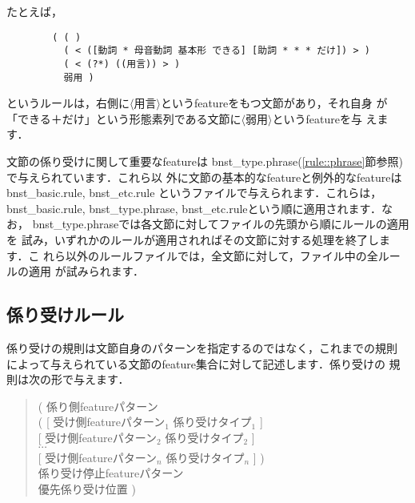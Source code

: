 \documentclass[a4j,11pt,titlepage]{jarticle}
\def\fl{$\langle$}
\def\fr{$\rangle$}
\begin{document}
たとえば，
\begin{verbatim}
        ( ( )
          ( < ([動詞 * 母音動詞 基本形 できる] [助詞 * * * だけ]) > )
          ( < (?*) ((用言)) > )
          弱用 )
\end{verbatim}
というルールは，右側に\fl 用言\fr というfeatureをもつ文節があり，それ自身
が「できる＋だけ」という形態素列である文節に\fl 弱用\fr というfeatureを与
えます．

文節の係り受けに関して重要なfeatureは
bnst\_type.phrase(\ref{rule::phrase}節参照)で与えられています．これら以
外に文節の基本的なfeatureと例外的なfeatureはbnst\_basic.rule,
bnst\_etc.rule というファイルで与えられます．これらは，bnst\_basic.rule,
bnst\_type.phrase, bnst\_etc.ruleという順に適用されます．なお，
bnst\_type.phraseでは各文節に対してファイルの先頭から順にルールの適用を
試み，いずれかのルールが適用されればその文節に対する処理を終了します．こ
れら以外のルールファイルでは，全文節に対して，ファイル中の全ルールの適用
が試みられます．


\subsection{係り受けルール}

係り受けの規則は文節自身のパターンを指定するのではなく，これまでの規則
によって与えられている文節のfeature集合に対して記述します．係り受けの
規則は次の形で与えます．
\begin{quote}
\hspace*{1cm} ( 係り側featureパターン \\
\hspace*{2cm}    ( [ 受け側featureパターン$_1$ 係り受けタイプ$_1$ ] \\
\hspace*{2.3cm}      [ 受け側featureパターン$_2$ 係り受けタイプ$_2$ ] \\
\hspace*{4cm}          $\cdots$ \\
\hspace*{2.3cm}      [ 受け側featureパターン$_n$ 係り受けタイプ$_n$ ] ) \\
\hspace*{2cm}    係り受け停止featureパターン  \\
\hspace*{2cm}    優先係り受け位置 ) 
\end{quote}
\end{document}

